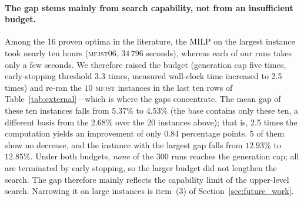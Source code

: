 \documentclass[manuscript,screen,review]{acmart}
\newcommand{\NSeeds}{10}
\newcommand{\PubNInst}{20}
\newcommand{\PubNOpt}{16}                 %
\newcommand{\PubNMatch}{12}               %
\newcommand{\PubGapMean}{2.68\%}          %
\newcommand{\PubGapMed}{0.00\%}
\newcommand{\PubGapMax}{12.93\%}
\newcommand{\PubGapBig}{9.96\%}           %
\newcommand{\PubGapMeanSeed}{5.29\%}      %
\newcommand{\PubBudgetRatio}{2.5}
\newcommand{\PubGapLoBudget}{5.37\%}      %
\newcommand{\PubGapHiBudget}{4.53\%}      %
\newcommand{\PubBudgetGainPP}{0.84}       %
\newcommand{\PubBudgetNoGain}{5}          %
\newcommand{\PubLBSlack}{10.3\%}          %
\newcommand{\PubLBTotal}{10.8\%}          %
\begin{document}
\begin{table}[t]
\caption{Degenerate comparison on public benchmarks (exclusivity constraint removed; the same problem as in the literature). In the ``reference'' column,
\textsc{opt} denotes a MILP-proven optimum and \textsc{bk} a best published value; the gap is computed from the best
solution over \NSeeds{} seeds. An asterisk marks instances whose best solution is identical digit for digit to the reference value.}
\label{tab:external}
\centering
\small

\end{table}

\paragraph{The gap stems mainly from search capability, not from an insufficient budget.}
Among the \PubNOpt{} proven optima in the literature, the MILP on the largest instance took nearly ten hours (\textsc{mfjst}06, $34\,796$ seconds), whereas each of our runs takes only a few seconds. We therefore raised the budget (generation cap five times, early-stopping threshold $3.3$ times, measured wall-clock time increased to \PubBudgetRatio{} times) and re-ran the $10$ \textsc{mfjst} instances in the last ten rows of Table~\ref{tab:external}---which is where the gaps concentrate.
The mean gap of these ten instances falls from \PubGapLoBudget{} to \PubGapHiBudget{} (the base contains only these ten, a different basis from the \PubGapMean{} over the \PubNInst{} instances above); that is, \PubBudgetRatio{} times the computation yields an improvement of only $\PubBudgetGainPP$ percentage points. \PubBudgetNoGain{} of them show no decrease, and the instance with the largest gap falls from $12.93\%$ to $12.85\%$.
Under both budgets, \emph{none} of the $300$ runs reaches the generation cap; all are terminated by early stopping, so the larger budget did not lengthen the search. The gap therefore mainly reflects the capability limit of the upper-level search. Narrowing it on large instances is item~(3) of Section~\ref{sec:future_work}.
\end{document}
